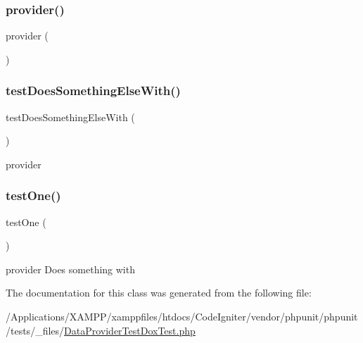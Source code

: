 \subsubsection{\texorpdfstring{provider()}{provider()}}
{\footnotesize\ttfamily provider (\begin{DoxyParamCaption}{ }\end{DoxyParamCaption})}

\mbox{\label{class_data_provider_test_dox_test_a29f464c709d52136a505b1d5d47d3b0d}} 
\subsubsection{\texorpdfstring{test\+Does\+Something\+Else\+With()}{testDoesSomethingElseWith()}}
{\footnotesize\ttfamily test\+Does\+Something\+Else\+With (\begin{DoxyParamCaption}{ }\end{DoxyParamCaption})}

provider \mbox{\label{class_data_provider_test_dox_test_afbf3ff88b322c6a7197ce02297cd23a0}} 
\subsubsection{\texorpdfstring{test\+One()}{testOne()}}
{\footnotesize\ttfamily test\+One (\begin{DoxyParamCaption}{ }\end{DoxyParamCaption})}

provider  Does something with 

The documentation for this class was generated from the following file\+:\begin{DoxyCompactItemize}
\item 
/\+Applications/\+X\+A\+M\+P\+P/xamppfiles/htdocs/\+Code\+Igniter/vendor/phpunit/phpunit/tests/\+\_\+files/\mbox{\hyperlink{_data_provider_test_dox_test_8php}{Data\+Provider\+Test\+Dox\+Test.\+php}}\end{DoxyCompactItemize}
